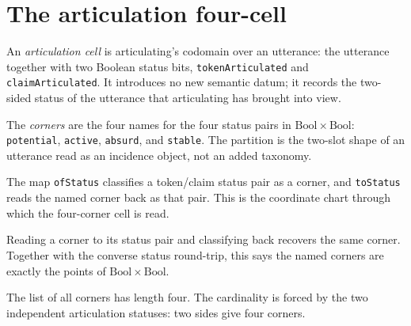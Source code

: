 \section{The articulation four-cell}

\begin{proposition}\label{thm:articulation-cell}\leanok{}
An \emph{articulation cell} is articulating's codomain over an utterance:
the utterance together with two Boolean status bits,
\texttt{tokenArticulated} and \texttt{claimArticulated}. It introduces no
new semantic datum; it records the two-sided status of the utterance that
articulating has brought into view.
\end{proposition}

\begin{proposition}\label{thm:corner}\leanok{}
The \emph{corners} are the four names for the four status pairs in
$\mathrm{Bool}\times\mathrm{Bool}$: \texttt{potential}, \texttt{active},
\texttt{absurd}, and \texttt{stable}. The partition is the two-slot shape of
an utterance read as an incidence object, not an added taxonomy.
\end{proposition}

\begin{proposition}\label{thm:status-correspondence}\leanok{}
The map \texttt{ofStatus} classifies a token/claim status pair as a corner,
and \texttt{toStatus} reads the named corner back as that pair. This is the
coordinate chart through which the four-corner cell is read.
\end{proposition}

\begin{lemma}\label{thm:corner-iso}\leanok{}
Reading a corner to its status pair and classifying back recovers the same
corner. Together with the converse status round-trip, this says the named
corners are exactly the points of $\mathrm{Bool}\times\mathrm{Bool}$.
\end{lemma}

\begin{theorem}\label{thm:corner-card}\leanok{}
The list of all corners has length four. The cardinality is forced by the
two independent articulation statuses: two sides give four corners.
\end{theorem}

